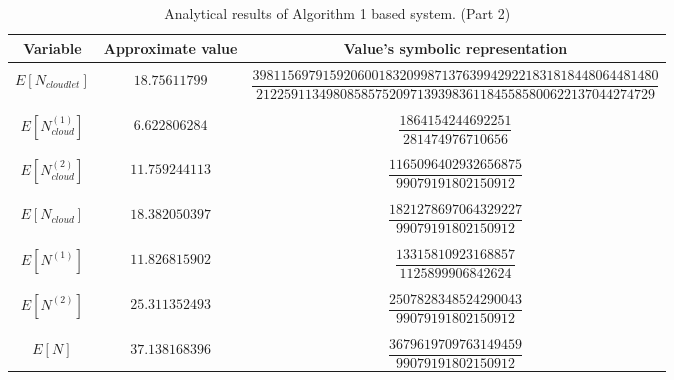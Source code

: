 \documentclass[10pt,a4paper]{article}
\begin{document}
\begin{table}[h!]
\caption{Analytical results of Algorithm 1 based system. (Part 2)}
\begin{adjustbox}{center=\textwidth}
	
     \begin{tabular}{c|c|c}
     \toprule
     \textbf{Variable} & \textbf{Approximate value} & \textbf{Value's symbolic representation} \\
     \toprule
	 &&\\
	 
	 $E[N_{cloudlet}]$ & $18.75611799$ & $\dfrac{3981156979159206001832099871376399429221831818448064481480}{212259113498085857520971393983611845585800622137044274729}$ \\
	 
	 &&\\\hline &&\\

	 $E[N^{(1)}_{cloud}]$ & $6.622806284$ & $\dfrac{1864154244692251}{281474976710656}$  \\

	 &&\\\hline &&\\
	
	 $E[N^{(2)}_{cloud}]$ & $11.759244113$ & $\dfrac{1165096402932656875}{99079191802150912}$   \\
     
     &&\\\hline &&\\
     
     $E[N_{cloud}]$ & $18.382050397$ & $\dfrac{1821278697064329227}{99079191802150912}$  \\
     
     &&\\\hline &&\\
     
     $E[N^{(1)}]$ & $11.826815902$ &  $\dfrac{13315810923168857}{1125899906842624}$   \\
     
     &&\\\hline &&\\
     
     $E[N^{(2)}]$ & $25.311352493$  &  $\dfrac{2507828348524290043}{99079191802150912}$ \\
     
     &&\\\hline &&\\
     
     $E[N]$ & $37.138168396$ & $\dfrac{3679619709763149459}{99079191802150912}$  \\
	

\end{tabular}
\end{adjustbox}
\end{table}
\end{document}
